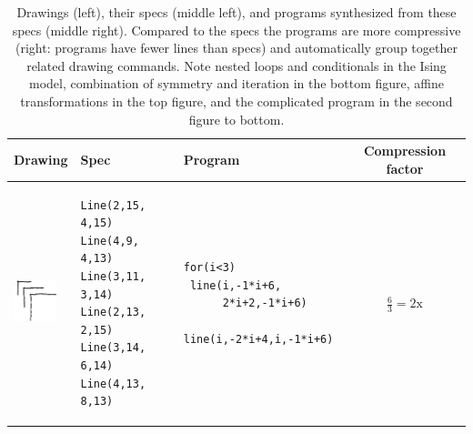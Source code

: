 \documentclass{article}
\theoremstyle{definition}
\begin{document}
\newcommand{\exampleProgramSize}{4cm}
\newcommand{\exampleTraceSize}{3.5cm}
\newcommand{\exampleDrawingSize}{1.25cm}
\lstset{basicstyle = \scriptsize\ttfamily}

\begin{table}[t]
  \caption{Drawings (left), their specs (middle left), and programs synthesized from these specs (middle right). Compared to the specs the programs are more compressive (right: programs have fewer lines than specs) and automatically group together related drawing commands. Note nested loops  and conditionals in the Ising model, combination of symmetry and iteration in the bottom figure,  affine transformations in the top figure, and the complicated program in the second figure to bottom.}\label{exampleSynthesisResults}
\centering  \begin{tabular}{m{1.5cm}llc}
    \toprule
    \textbf{Drawing}&\textbf{Spec}&\textbf{Program}&%
      \textbf{Compression factor}%
      \\
    \midrule
    \includegraphics[width = \exampleDrawingSize]{figures/expert-29-trim.png}&
\begin{minipage}{\exampleTraceSize}\begin{lstlisting}
Line(2,15, 4,15)
Line(4,9, 4,13)
Line(3,11, 3,14)
Line(2,13, 2,15)
Line(3,14, 6,14)
Line(4,13, 8,13)
\end{lstlisting}
\end{minipage}&     \begin{minipage}{\exampleProgramSize} \begin{lstlisting}
for(i<3)
 line(i,-1*i+6,
      2*i+2,-1*i+6)
 line(i,-2*i+4,i,-1*i+6)
       \end{lstlisting}
     \end{minipage}&$\frac{6}{3} = 2\text{x}$\\\midrule

\end{tabular}
\end{table}
\end{document}
